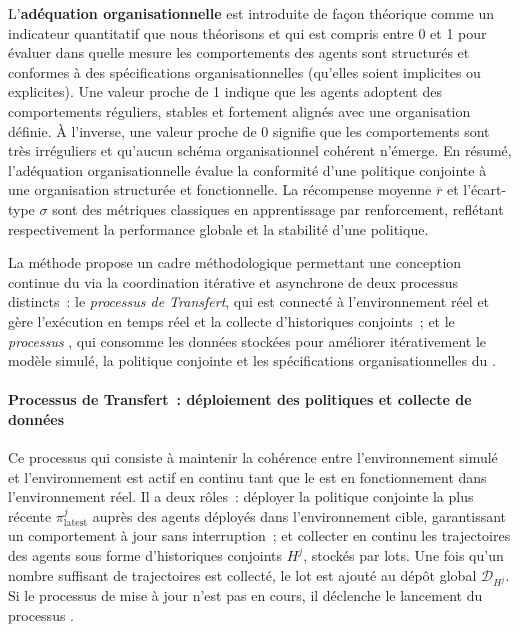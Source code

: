 L'\textbf{adéquation organisationnelle} est introduite de façon théorique comme un indicateur quantitatif que nous théorisons et qui est compris entre 0 et 1 pour évaluer dans quelle mesure les comportements des agents sont structurés et conformes à des spécifications organisationnelles (qu'elles soient implicites ou explicites). Une valeur proche de 1 indique que les agents adoptent des comportements réguliers, stables et fortement alignés avec une organisation définie. À l'inverse, une valeur proche de 0 signifie que les comportements sont très irréguliers et qu'aucun schéma organisationnel cohérent n'émerge. En résumé, l'adéquation organisationnelle évalue la conformité d'une politique conjointe à une organisation structurée et fonctionnelle.
La récompense moyenne $\overline{r}$ et l'écart-type $\sigma$ sont des métriques classiques en apprentissage par renforcement, reflétant respectivement la performance globale et la stabilité d'une politique.


La méthode  propose un cadre méthodologique permettant une conception continue du  via la coordination itérative et asynchrone de deux processus distincts~: le \textit{processus de Transfert}, qui est connecté à l'environnement réel et gère l'exécution en temps réel et la collecte d'historiques conjoints~; et le \textit{processus }, qui consomme les données stockées pour améliorer itérativement le modèle simulé, la politique conjointe et les spécifications organisationnelles du .

\paragraph{Processus de Transfert~: déploiement des politiques et collecte de données}

Ce processus qui consiste à maintenir la cohérence entre l'environnement simulé et l'environnement est actif en continu tant que le  est en fonctionnement dans l'environnement réel. Il a deux rôles~: déployer la politique conjointe la plus récente $\pi^j_{\text{latest}}$ auprès des agents déployés dans l'environnement cible, garantissant un comportement à jour sans interruption~; et collecter en continu les trajectoires des agents sous forme d'historiques conjoints $H^j$, stockés par lots. Une fois qu'un nombre suffisant de trajectoires est collecté, le lot est ajouté au dépôt global $\mathcal{D}_{H^j}$. Si le processus de mise à jour n'est pas en cours, il déclenche le lancement du processus .

